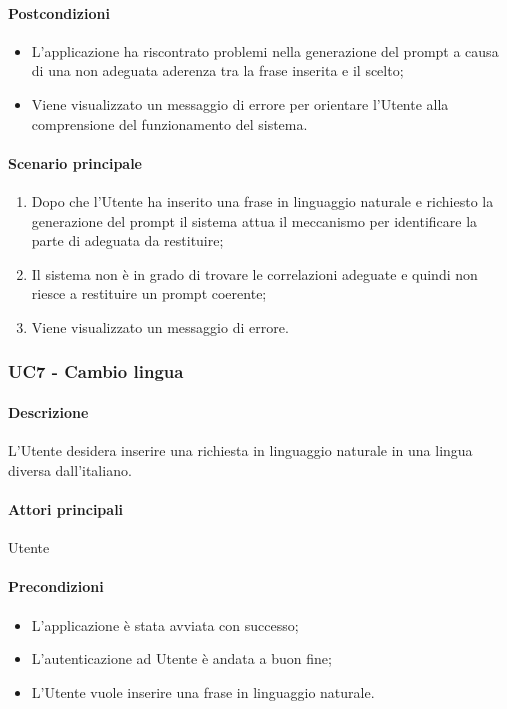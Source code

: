 \paragraph*{Postcondizioni}
\begin{itemize}
  \item L’applicazione ha riscontrato problemi nella generazione del prompt a causa di una non adeguata aderenza tra la frase inserita e il  scelto;
  \item Viene visualizzato un messaggio di errore per orientare l’Utente alla comprensione del funzionamento del sistema.
\end{itemize}

\paragraph*{Scenario principale}
\begin{enumerate}
  \item Dopo che l’Utente ha inserito una frase in linguaggio naturale e richiesto la generazione del prompt il sistema attua il meccanismo per identificare la parte di  adeguata da restituire;
  \item Il sistema non è in grado di trovare le correlazioni adeguate e quindi non riesce a restituire un prompt coerente;
  \item Viene visualizzato un messaggio di errore.  
\end{enumerate}


\subsubsection{UC7 - Cambio lingua}\label{UC7}

\paragraph*{Descrizione}
L’Utente desidera inserire una richiesta in linguaggio naturale in una lingua diversa dall’italiano.

\paragraph*{Attori principali} Utente

\paragraph*{Precondizioni}
\begin{itemize}
  \item L'applicazione è stata avviata con successo;
  \item L’autenticazione ad Utente è andata a buon fine;
  \item L’Utente vuole inserire una frase in linguaggio naturale.
\end{itemize}


